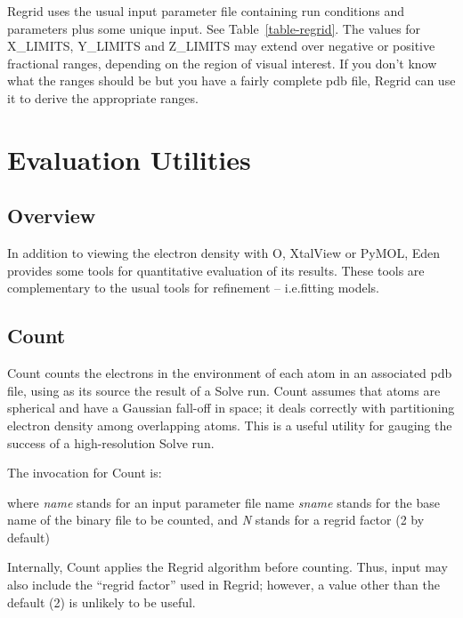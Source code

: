 \documentclass{report}
\begin{document}
{Regrid uses the usual input parameter file containing run conditions and 
parameters plus some unique input.  See Table~\ref{table-regrid}.  
The values for X\_LIMITS,
 Y\_LIMITS  and Z\_LIMITS 
may extend over negative or
positive fractional ranges, depending on the region of visual interest.
If you don't know what the ranges should be but you have a fairly complete 
pdb file, Regrid can use it to derive the appropriate ranges.


\chapter {Evaluation Utilities}
\label{evaluation}

\section {Overview}

In addition to viewing the electron density with O, XtalView or PyMOL,
Eden provides some tools for quantitative evaluation of its results.  
These tools are complementary to the usual tools for 
refinement -- i.e.fitting models.

\section {Count}
\label{evaluation-count}

Count counts the electrons in the environment of each atom in an 
associated pdb file, using as its source the result of a Solve 
run.  Count assumes that atoms are spherical and have a Gaussian fall-off
in space; it deals correctly with partitioning electron density among
overlapping atoms.  This is a useful utility for
gauging the success  of a high-resolution Solve run.

The invocation for Count is:


where {\it name} stands for an input parameter file name
      {\it sname} stands for the base name of the binary
                        file to be counted,
  and {\it N}  stands for a regrid factor (2 by default)

Internally, Count applies the Regrid algorithm before counting. Thus, input
may also include the ``regrid factor'' used in Regrid; however, a value 
other than the default (2) is unlikely to be useful.

}
\end{document}
